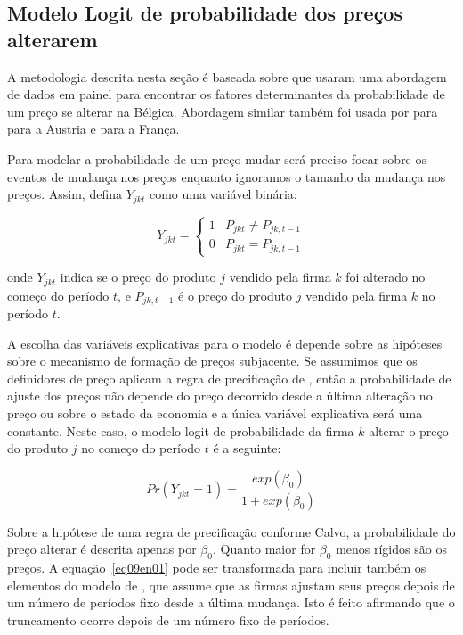 \documentclass[twoside,a4paper,11pt]{report}
\begin{document}
\subsection*{Modelo Logit de probabilidade dos preços alterarem}

A metodologia descrita nesta seção é baseada sobre \citet{aucremanne2005time} que usaram uma abordagem de dados em painel para encontrar os fatores determinantes da probabilidade de um preço se alterar na Bélgica. Abordagem similar também foi usada por \citet{lunnemann2005consumer} para \citet{baumgartner2005frequently} para a Austria e \citet{baudry2004price} para a França.

Para modelar a probabilidade de um preço mudar será preciso focar sobre os eventos de mudança nos preços enquanto ignoramos o tamanho da mudança nos preços. Assim, defina $Y_{jkt}$ como uma variável binária:

\begin{equation}\label{eq08en01}
Y_{jkt} =\begin{cases}1 &  P_{jkt} \neq P_{jk,t-1}\\0 & P_{jkt} = P_{jk,t-1}\end{cases}
\end{equation}

\noindent onde ${Y}_{jkt}$ indica se o preço do produto $j$ vendido pela firma $k$ foi alterado no começo do período $t$, e ${P}_{jk,t-1}$ é o preço do produto $j$ vendido pela firma $k$ no período $t$. 

A escolha das variáveis explicativas para o modelo é depende sobre as hipóteses sobre o mecanismo de formação de preços subjacente. Se assumimos que os definidores de preço aplicam a regra de precificação de \citet{calvo1983staggered}, então a probabilidade de ajuste dos preços não depende do preço decorrido desde a última alteração no preço ou sobre o estado da economia e a única variável explicativa será uma constante. Neste caso, o modelo logit de probabilidade da firma $k$ alterar o preço do produto $j$ no começo do período $t$ é a seguinte:

\begin{equation}\label{eq09en01}
Pr\left( { Y }_{ jkt }=1 \right) =\frac { exp\left( { \beta  }_{ 0 } \right)  }{ 1+exp\left( { \beta  }_{ 0 } \right)  } 
\end{equation}

Sobre a hipótese de uma regra de precificação conforme Calvo, a probabilidade do preço alterar é descrita apenas por ${ \beta  }_{ 0 }$. Quanto maior for ${ \beta  }_{ 0 }$ menos rígidos são os preços. A equação~\ref{eq09en01} pode ser transformada para incluir também os elementos do modelo de \citet{taylor1980aggregate}, que assume que as firmas ajustam seus preços depois de um número de períodos fixo desde a última mudança. Isto é feito afirmando que o truncamento ocorre depois de um número fixo de períodos.
\end{document}
